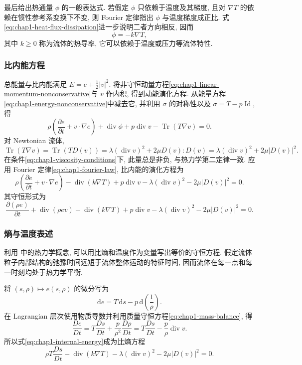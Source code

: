 最后给出热通量 $\phi$ 的一般表达式. 若假定 $\phi$ 只依赖于温度及其梯度, 且对 $\nabla T$ 的依赖在惯性参考系变换下不变, 则 Fourier 定律指出 $\phi$ 与温度梯度成正比. 式\eqref{eq:chap1-heat-flux-dissipation}进一步说明二者方向相反, 因而
\begin{equation}
\label{eq:chap1-fourier-law}
  \phi=-k\nabla T,
\end{equation}
其中 $k\geq0$ 称为流体的热导率, 它可以依赖于温度或压力等流体特性.

\subsubsection{比内能方程}
\label{subsec:chap1-internal-energy}

总能量与比内能满足 $E=e+\tfrac12|v|^2$. 将非守恒动量方程\eqref{eq:chap1-linear-momentum-nonconservative}与 $v$ 作内积, 得到动能演化方程. 从能量方程\eqref{eq:chap1-energy-nonconservative}中减去它, 并利用 $\sigma$ 的对称性以及 $\sigma=T-p\operatorname{Id}$, 得
\[
  \rho\left(\frac{\partial e}{\partial t}+v\cdot\nabla e\right)
  +\operatorname{div}\phi+p\operatorname{div}v-\operatorname{Tr}(T\nabla v)=0.
\]
对 Newtonian 流体,
\[
\operatorname{Tr}(T\nabla v)=\operatorname{Tr}(TD(v))
=\lambda(\operatorname{div}v)^2+2\mu D(v):D(v)
=\lambda(\operatorname{div}v)^2+2\mu|D(v)|^2.
\]
在条件\eqref{eq:chap1-viscosity-conditions}下, 此量总是非负, 与热力学第二定律一致. 应用 Fourier 定律\eqref{eq:chap1-fourier-law}, 比内能的演化方程为
\begin{equation}
\label{eq:chap1-internal-energy}
\rho\left(\frac{\partial e}{\partial t}+v\cdot\nabla e\right)
-\operatorname{div}(k\nabla T)+p\operatorname{div}v
-\lambda(\operatorname{div}v)^2-2\mu|D(v)|^2=0.
\end{equation}
其守恒形式为
\[
\frac{\partial(\rho e)}{\partial t}+\operatorname{div}(\rho ev)
-\operatorname{div}(k\nabla T)+p\operatorname{div}v
-\lambda(\operatorname{div}v)^2-2\mu|D(v)|^2=0.
\]

\subsubsection{熵与温度表述}
\label{subsec:chap1-entropy-temperature}

利用 中的热力学概念, 可以用比熵和温度作为变量写出等价的守恒方程. 假定流体粒子内部结构的弛豫时间远短于流体整体运动的特征时间, 因而流体在每一点和每一时刻均处于热力学平衡.

将 $(s,\rho)\mapsto e(s,\rho)$ 的微分写为
\[
  \mathrm{d}e=T\,\mathrm{d}s-p\,\mathrm{d}\left(\frac1\rho\right).
\]
在 Lagrangian 层次使用物质导数并利用质量守恒方程\eqref{eq:chap1-mass-balance}, 得
\[
  \frac{De}{Dt}=T\frac{Ds}{Dt}+\frac{p}{\rho^2}\frac{D\rho}{Dt}
  =T\frac{Ds}{Dt}-\frac p\rho\operatorname{div}v.
\]
所以式\eqref{eq:chap1-internal-energy}成为比熵方程
\[
  \rho T\frac{Ds}{Dt}-\operatorname{div}(k\nabla T)
  -\lambda(\operatorname{div}v)^2-2\mu|D(v)|^2=0.
\]


